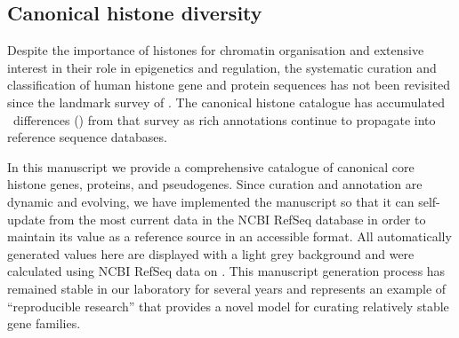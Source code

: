   \subsection{Canonical histone diversity}

    Despite the importance of histones for chromatin organisation and extensive interest
    in their role in epigenetics and regulation, the systematic
    curation and classification of human histone
    gene and protein sequences has not been revisited
    since the landmark survey of \citet{Marzluff02}.
    The canonical histone catalogue has accumulated
    \TotalChangesSinceReference{}~differences ()
    from that survey as rich annotations continue to propagate
    into reference sequence databases.

    In this manuscript we provide a comprehensive catalogue
    of canonical core histone genes, proteins, and pseudogenes.
    Since curation and annotation are dynamic and evolving,
    we have implemented the manuscript so that it can
    self-update from the most current data in the NCBI RefSeq database
    in order to maintain its value as a reference source in an accessible format.
    All automatically generated values here are displayed with a light grey background
    and were calculated using NCBI RefSeq data on \printdate{\SequencesDate{}}.
    This manuscript generation process has remained stable in our laboratory for several years
    and represents an example of ``reproducible research'' \citep{Claerbout2000}
    that provides a novel model for curating relatively stable gene families.
